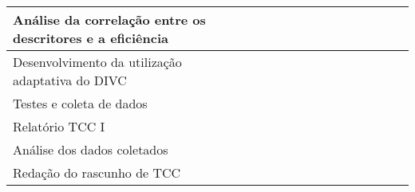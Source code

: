 {\begin{tabular}{|X p{5cm}|c|c|c|c|c|c|c|c|c|c|c|c|}
		\hiderowcolors Análise da correlação entre os descritores e a eficiência &                        & \cellcolor{shadecolor} & \cellcolor{shadecolor} & \cellcolor{shadecolor} &                        &                        &                        &                        &                        &                        &                        &                        \\ \hline

		\hiderowcolors Desenvolvimento da utilização adaptativa do \ac{DIVC}     &                        &                        &                        & \cellcolor{shadecolor} & \cellcolor{shadecolor} & \cellcolor{shadecolor} &                        &                        &                        &                        &                        &                        \\ \hline

		\hiderowcolors Testes e coleta de dados                                  &                        &                        &                        &                        & \cellcolor{shadecolor} & \cellcolor{shadecolor} & \cellcolor{shadecolor} & \cellcolor{shadecolor} & \cellcolor{shadecolor} &                        &                        &                        \\ \hline

		\hiderowcolors Relatório TCC I                                           &                        &                        &                        &                        & \cellcolor{shadecolor} & \cellcolor{shadecolor} &                        &                        &                        &                        &                        &
		\\ \hline

		\hiderowcolors Análise dos dados coletados                               &                        &                        &                        &                        &                        &                        &                        &                        & \cellcolor{shadecolor} & \cellcolor{shadecolor} &                        &                        \\ \hline

		\hiderowcolors Redação do rascunho de TCC                                &                        &                        &                        &                        &                        &                        &                        & \cellcolor{shadecolor} & \cellcolor{shadecolor} & \cellcolor{shadecolor} &                        &                        \\ \hline


\end{tabular}}

